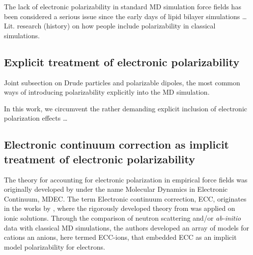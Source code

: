 The lack of electronic polarizability in standard MD simulation
force fields has been considered a serious issue since the early days of
lipid bilayer simulations \dots
  Lit. research (history) on how people include polarizability in classical simulations. 

\subsection{Explicit treatment of electronic polarizability}

 Joint subsection on Drude particles and polarizable dipoles, the most common ways of introducing polarizability explicitly into the MD simulation. 

In this work, we circumvent the rather demanding explicit inclusion
of electronic polarization effects \cite{lucas12,chowdhary13} \dots

\subsection{Electronic continuum correction as implicit treatment of electronic polarizability}
\label{section:ecc}

The theory for accounting for electronic polarization in empirical force fields
was originally developed by \citet{leontyev09} under the name Molecular Dynamics in Electronic Continuum, MDEC. 
The term Electronic continuum correction, ECC, originates in the works by \citet{Pluharova2014, kohagen14, kohagen16, martinek17},
where the rigorously developed theory from \citep{leontyev14} was applied on ionic solutions.
Through the comparison of neutron scattering and/or \emph{ab-initio} data with classical MD simulations, 
the authors developed an array of models for cations an anions, here termed ECC-ions,
that embedded ECC as an implicit model polarizability for electrons. 


